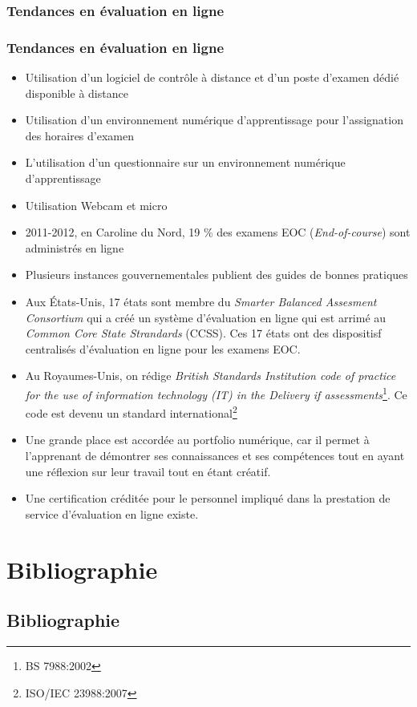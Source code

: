 \documentclass[aspectratio=169]{beamer}
\begin{document}
		\subsubsection{Tendances en évaluation en ligne} 
				\begin{frame}[allowframebreaks]
					\frametitle{Tendances en évaluation en ligne}				 	
				 	\begin {itemize}
						\item Utilisation d’un logiciel de contrôle à distance et d’un poste d’examen dédié disponible à distance
						\item Utilisation d'un environnement numérique d'apprentissage pour l’assignation des horaires d’examen			
						\item L’utilisation d’un questionnaire sur un environnement numérique d'apprentissage
						\item Utilisation Webcam et micro
						\item 2011-2012, en Caroline du Nord, 19 \% des examens EOC  (\textit{End-of-course}) sont administrés en ligne\citep{NorthCarolina2013}
						\item Plusieurs instances gouvernementales publient des guides de bonnes pratiques
						\item Aux États-Unis, 17 états sont membre du \textit{Smarter Balanced Assesment Consortium} qui a créé un système d'évaluation en ligne qui est arrimé au \textit{Common Core State Strandards} (CCSS). Ces 17 états ont des dispositisf centralisés d'évaluation en ligne pour les examens EOC.
						\item Au Royaumes-Unis, on rédige \textit{British Standards Institution code of practice for the use of information technology (IT) in the Delivery if assessments}\footnote{BS 7988:2002}. Ce code est devenu un standard international\footnote{ISO/IEC 23988:2007}
						\item Une grande place est accordée au portfolio numérique, car il permet à l'apprenant de démontrer ses connaissances et ses compétences tout en ayant une réflexion sur leur travail tout en étant créatif.
						\item Une certification créditée pour le personnel impliqué dans la prestation de service d'évaluation en ligne existe.
					\end{itemize}
\end{frame}
		
				
			

\section{Bibliographie}
\subsection{Bibliographie}
\end{document}
